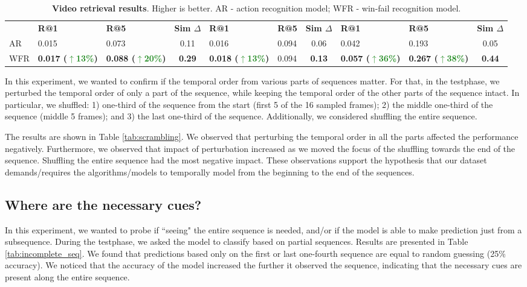 \documentclass[final]{cvpr}
\begin{document}
\begin{table*}[]
\begin{tabular}{lllcllcllc}
                                & \textbf{R@1}         & \textbf{R@5}          & \textbf{Sim $\Delta$} & \textbf{R@1}          & \textbf{R@5} & \textbf{Sim $\Delta$} & \textbf{R@1}          & \textbf{R@5}          & \textbf{Sim $\Delta$} \\ \cmidrule(r){1-1} \cmidrule(l){2-2} \cmidrule(l){3-3} \cmidrule(l){4-4} \cmidrule(l){5-5} \cmidrule(l){6-6} \cmidrule(l){7-7} \cmidrule(l){8-8} \cmidrule(l){9-9} \cmidrule(l){10-10}
AR              & 0.015                 & 0.073                 & 0.11           & 0.016                 & 0.094        & 0.06           & 0.042                 & 0.193                 & 0.05           \\
WFR            & \textbf{0.017 (\textcolor{ForestGreen}{$\uparrow$13\%})} & \textbf{0.088 (\textcolor{ForestGreen}{$\uparrow$20\%})} & \textbf{0.29}  & \textbf{0.018 (\textcolor{ForestGreen}{$\uparrow$13\%})} & 0.094  & \textbf{0.13}  & \textbf{0.057 (\textcolor{ForestGreen}{$\uparrow$36\%})} & \textbf{0.267 (\textcolor{ForestGreen}{$\uparrow$38\%})} & \textbf{0.44}  \\ \bottomrule
\end{tabular}
\caption{\textbf{Video retrieval results}. Higher is better. AR - action recognition model; WFR - win-fail recognition model.}
\label{tab:res_video_retrieval}
\end{table*} In this experiment, we wanted to confirm if the temporal order from various parts of sequences matter. For that, in the testphase, we perturbed the temporal order of only a part of the sequence, while keeping the temporal order of the other parts of the sequence intact. In particular, we shuffled: 1) one-third of the sequence from the start (first 5 of the 16 sampled frames); 2) the middle one-third of the sequence (middle 5 frames); and 3) the last one-third of the sequence. Additionally, we considered shuffling the entire sequence.

The results are shown in Table \ref{tab:scrambling}. We observed that perturbing the temporal order in all the parts affected the performance negatively. Furthermore, we observed that impact of perturbation increased as we moved the focus of the shuffling towards the end of the sequence. Shuffling the entire sequence had the most negative impact. These observations support the hypothesis that our dataset demands/requires the algorithms/models to temporally model from the beginning to the end of the sequences.
\subsection{Where are the necessary cues?}
\label{sec:exp_incomplete_seq}
In this experiment, we wanted to probe if ``seeing" the entire sequence is needed, and/or if the model is able to make prediction just from a subsequence. During the testphase, we asked the model to classify based on partial sequences. Results are presented in Table \ref{tab:incomplete_seq}. We found that predictions based only on the first or last one-fourth sequence are equal to random guessing (25\% accuracy). We noticed that the accuracy of the model increased the further it observed the sequence, indicating that the necessary cues are present along the entire sequence.
\end{document}
